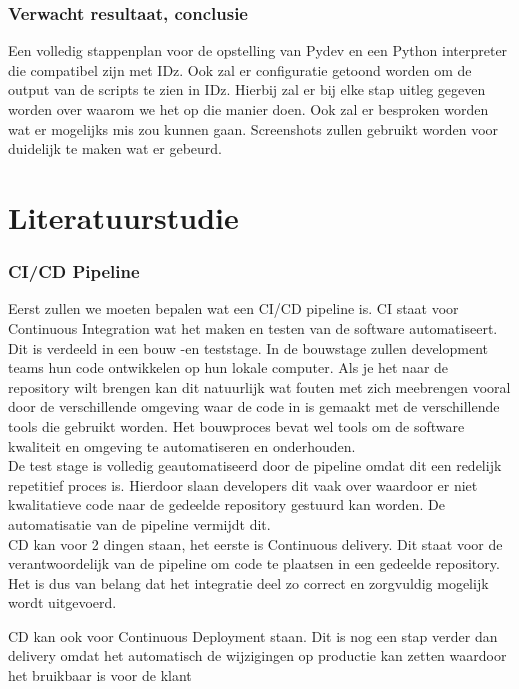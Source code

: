 \section{Verwacht resultaat, conclusie}%
\label{sec:verwachte_resultaten}
Een volledig stappenplan voor de opstelling van Pydev en een Python interpreter die compatibel zijn met IDz. Ook zal er configuratie getoond worden om de output van de scripts te zien in IDz. Hierbij zal er bij elke stap uitleg gegeven worden over waarom we het op die manier doen. Ook zal er besproken worden wat er mogelijks mis zou kunnen gaan. Screenshots zullen gebruikt worden voor duidelijk te maken wat er gebeurd.


\part{Literatuurstudie}
\section{CI/CD Pipeline}
Eerst zullen we moeten bepalen wat een CI/CD pipeline is. CI staat voor Continuous Integration wat het maken en testen van de software automatiseert. Dit is verdeeld in een bouw -en teststage. In de bouwstage zullen development teams hun code ontwikkelen op hun lokale computer. Als je het naar de repository wilt brengen kan dit natuurlijk wat fouten met zich meebrengen vooral door de verschillende omgeving waar de code in is gemaakt met de verschillende tools die gebruikt worden. Het bouwproces bevat wel tools om de software kwaliteit en omgeving te automatiseren en onderhouden. \autocite{Fosco2022} \\

De test stage is volledig geautomatiseerd door de pipeline omdat dit een redelijk repetitief proces is. Hierdoor slaan developers dit vaak over waardoor er niet kwalitatieve code naar de gedeelde repository gestuurd kan worden. De automatisatie van de pipeline vermijdt dit. \autocite{Fosco2022} \\

CD kan voor 2 dingen staan, het eerste is Continuous delivery. Dit staat voor de verantwoordelijk van de pipeline om code te plaatsen in een gedeelde repository. Het is dus van belang dat het integratie deel zo correct en zorgvuldig mogelijk wordt uitgevoerd. 

CD kan ook voor Continuous Deployment staan. Dit is nog een stap verder dan delivery omdat het automatisch de wijzigingen op productie kan zetten waardoor het bruikbaar is voor de klant \autocite{RedHat2023} 

